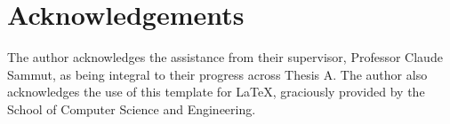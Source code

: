 \chapter*{Acknowledgements}\label{ack}

The author acknowledges the assistance from their supervisor, Professor Claude Sammut, as being integral to their progress across Thesis A.
The author also acknowledges the use of this template for \LaTeX, graciously provided by the School of Computer Science and Engineering.